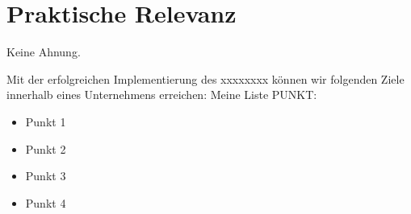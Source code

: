 \section{Praktische Relevanz}

Keine Ahnung.


Mit der erfolgreichen Implementierung des xxxxxxxx können wir folgenden Ziele innerhalb eines Unternehmens erreichen:
Meine Liste PUNKT:
\begin{itemize}
    \item Punkt 1
    \item Punkt 2
    \item Punkt 3
    \item Punkt 4
\end{itemize}

